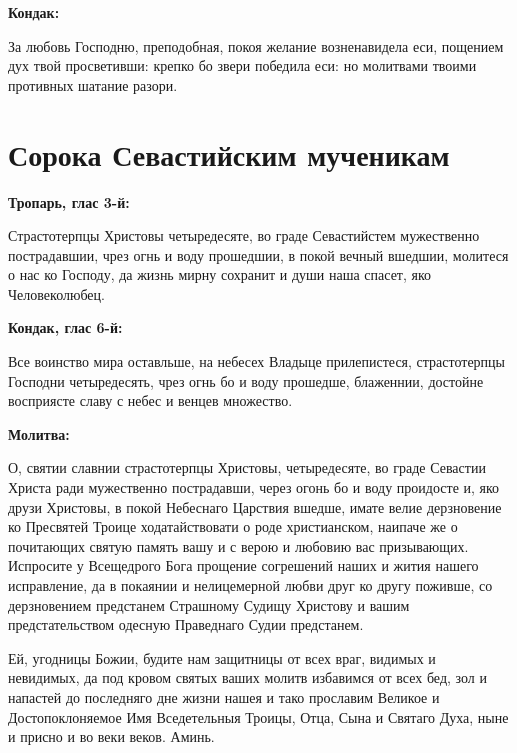 \bfseries Кондак:\normalfont{}

 За любовь Господню, преподобная, покоя желание возненавидела еси, пощением дух твой просветивши: крепко бо звери победила еси: но молитвами твоими противных шатание разори.



 

\section{Сорока Севастийским мученикам}
 


\bfseries Тропарь, глас 3-й:\normalfont{}


Страстотерпцы Христовы четыредесяте, во граде Севастийстем мужественно пострадавшии, чрез огнь и воду прошедшии, в покой вечный вшедшии, молитеся о нас ко Господу, да жизнь мирну сохранит и души наша спасет, яко Человеколюбец.


\medskip


\bfseries Кондак, глас 6-й:\normalfont{}


Все воинство мира оставльше, на небесех Владыце прилепистеся, страстотерпцы Господни четыредесять, чрез огнь бо и воду прошедше, блаженнии, достойне восприясте славу с небес и венцев множество.


\medskip


\bfseries Молитва:\normalfont{}


О, святии славнии страстотерпцы Христовы, четыредесяте, во граде Севастии Христа ради мужественно пострадавши, через огонь бо и воду проидосте и, яко друзи Христовы, в покой Небеснаго Царствия вшедше, имате велие дерзновение ко Пресвятей Троице ходатайствовати о роде христианском, наипаче же о почитающих святую память вашу и с верою и любовию вас призывающих. Испросите у Всещедрого Бога прощение согрешений наших и жития нашего исправление, да в покаянии и нелицемерной любви друг ко другу поживше, со дерзновением предстанем Страшному Судищу Христову и вашим предстательством одесную Праведнаго Судии предстанем.

Ей, угодницы Божии, будите нам защитницы от всех враг, видимых и невидимых, да под кровом святых ваших молитв избавимся от всех бед, зол и напастей до последняго дне жизни нашея и тако прославим Великое и Достопоклоняемое Имя Вседетельныя Троицы, Отца, Сына и Святаго Духа, ныне и присно и во веки веков. Аминь.


